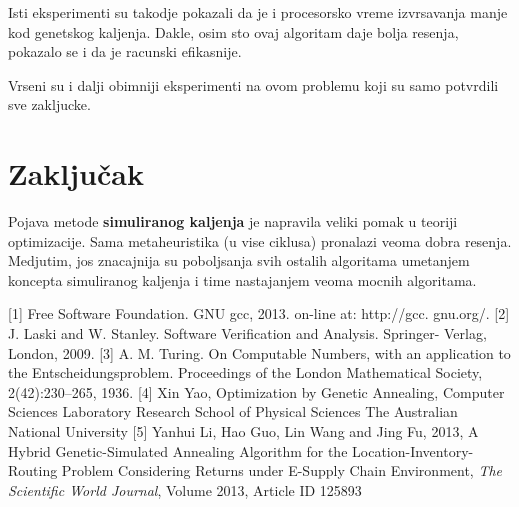 \documentclass[a4paper]{article}
\begin{document}
Isti eksperimenti su takodje pokazali da je i procesorsko vreme izvrsavanja manje kod genetskog kaljenja. Dakle, osim sto ovaj algoritam daje bolja resenja, pokazalo se i da je racunski efikasnije. \par Vrseni su i dalji obimniji eksperimenti na ovom problemu koji su samo potvrdili sve zakljucke.


\section{Zaključak}
\label{sec:zakljucak}

Pojava metode \textbf{simuliranog kaljenja} je napravila veliki pomak u teoriji optimizacije. Sama metaheuristika (u vise ciklusa) pronalazi veoma dobra resenja. Medjutim, jos znacajnija su poboljsanja svih ostalih algoritama umetanjem koncepta simuliranog kaljenja i time nastajanjem veoma mocnih algoritama.


\newpage
{}

\appendix

 



[1] Free Software Foundation. GNU gcc, 2013. on-line at: http://gcc.
gnu.org/.
[2] J. Laski and W. Stanley. Software Verification and Analysis. Springer-
Verlag, London, 2009.
[3] A. M. Turing. On Computable Numbers, with an application to the
Entscheidungsproblem. Proceedings of the London Mathematical Society,
2(42):230–265, 1936.
[4] Xin Yao, Optimization by Genetic Annealing, Computer Sciences Laboratory
Research School of Physical Sciences
The Australian National University
[5] Yanhui Li, Hao Guo, Lin Wang and Jing Fu, 2013, A Hybrid Genetic-Simulated Annealing Algorithm for the Location-Inventory-Routing Problem Considering Returns under E-Supply Chain Environment, \textit{The Scientific World Journal}, Volume 2013, Article ID 125893
\end{document}

